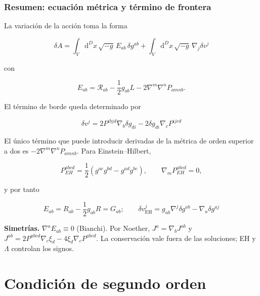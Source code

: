 \documentclass{beamer}
\renewcommand{\dd}{\mathrm{d}}
\newcommand{\CompactDisplaySpacing}{%
  \setlength{\abovedisplayskip}{2pt plus 1pt minus 1pt}%
  \setlength{\belowdisplayskip}{2pt plus 1pt minus 1pt}%
  \setlength{\abovedisplayshortskip}{0pt plus 1pt}%
  \setlength{\belowdisplayshortskip}{1pt plus 1pt}%
}
\newcommand{\DenseDisplaySpacing}{%
\setlength{\abovedisplayskip}{1pt}%
\setlength{\belowdisplayskip}{1pt}%
\setlength{\abovedisplayshortskip}{0pt}%
\setlength{\belowdisplayshortskip}{0pt}%
\setlength{\jot}{1pt}%
}
\begin{document}
\begin{frame}[label=nav-frame-049]
\frametitle{Resumen: ecuación métrica y término de frontera}

\linespread{.96}\selectfont\CompactDisplaySpacing


\scriptsize\DenseDisplaySpacing

La variación de la acción toma la forma

\[
\delta A
=
\int_V \dd^D x\,\sqrt{-g}\,
E_{ab}\,\delta g^{ab}
+
\int_V \dd^D x\,\sqrt{-g}\,
\nabla_j\delta v^j
\]

con

\[
E_{ab}
=
\mathcal R_{ab}
-\frac12 g_{ab}L
-2\nabla^m\nabla^nP_{amnb}.
\]

El término de borde queda determinado por

\[
\delta v^j
=
2P^{ibjd}\nabla_b\delta g_{di}
-
2\delta g_{di}\nabla_cP^{ijcd}
\]


El único término que puede introducir derivadas de la métrica de orden superior a dos es $ -2\nabla^m\nabla^nP_{amnb}$. Para Einstein--Hilbert,

\[
P^{abcd}_{EH}
=
\frac12
\left(
g^{ac}g^{bd}-g^{ad}g^{bc}
\right),
\qquad
\nabla_mP^{abcd}_{EH}=0,
\]

y por tanto

\[
E_{ab}
=
R_{ab}-\frac12g_{ab}R
=
G_{ab} ;\qquad
\delta v_{\mathrm{EH}}^{j}
=
g_{ab}\nabla^j\delta g^{ab}
-
\nabla_a\delta g^{aj}
\]

\par\medskip
\textbf{Simetrías.} $\nabla^aE_{ab}\equiv0$ (Bianchi). Por Noether,
$J^a=\nabla_bJ^{ab}$ y $J^{ab}=2P^{abcd}\nabla_c\xi_d-4\xi_d\nabla_cP^{abcd}$.
La conservación vale fuera de las soluciones; EH y $\Lambda$ controlan los signos.
\end{frame}
\section{Condición de segundo orden}
\end{document}
